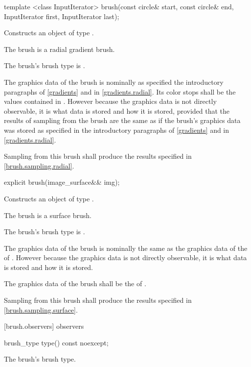 \begin{itemdecl}
template <class InputIterator>
brush(const circle& start, const circle& end,
  InputIterator first, InputIterator last);
\end{itemdecl}
\begin{itemdescr}
\pnum
\effects
Constructs an object of type .

\pnum
The brush is a radial gradient brush.

\pnum

\pnum
The brush's brush type is .

\pnum
The graphics data of the brush is nominally as specified the introductory paragraphs of \ref{gradients} and in \ref{gradients.radial}. Its color stops shall be the values contained in . However because the graphics data is not directly observable, it is \unspecnorm what data is stored and how it is stored, provided that the results of sampling from the brush are the same as if the brush's graphics data was stored as specified in the introductory paragraphs of \ref{gradients} and in \ref{gradients.radial}.

\pnum
\remarks
Sampling from this brush shall produce the results specified in \ref{brush.sampling.radial}.
\end{itemdescr}

\begin{itemdecl}
explicit brush(image_surface&& img);
\end{itemdecl}
\begin{itemdescr}
\pnum
\pnum
\effects
Constructs an object of type .

\pnum
The brush is a surface brush.

\pnum
The brush's brush type is .

\pnum
The graphics data of the brush is nominally the same as the graphics data of the \underlyingimagesurface of . However because the graphics data is not directly observable, it is \unspecnorm what data is stored and how it is stored.

\pnum
The graphics data of the brush shall be the \underlyingimagesurface of .

\pnum
\remarks
Sampling from this brush shall produce the results specified in \ref{brush.sampling.surface}.
\end{itemdescr}

 [brush.observers]{ observers}

\begin{itemdecl}
brush_type type() const noexcept;
\end{itemdecl}
\begin{itemdescr}
\pnum
\returns
The brush's brush type.
\end{itemdescr}

